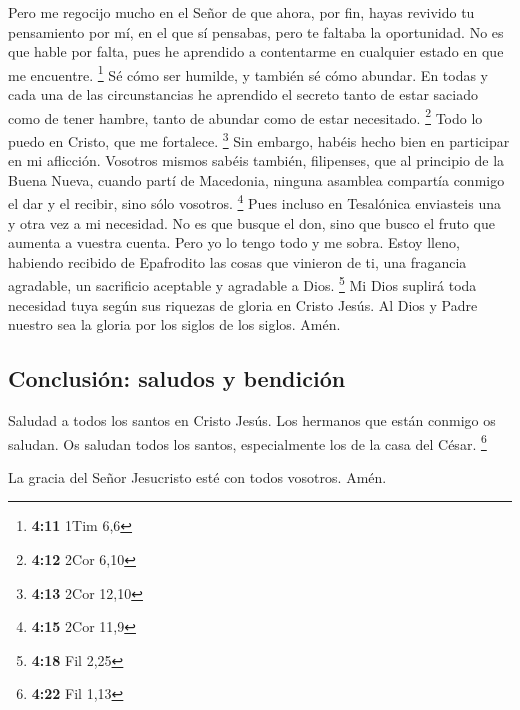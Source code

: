  Pero me regocijo mucho en el Señor de que ahora, por
fin, hayas revivido tu pensamiento por mí, en el que sí pensabas, pero
te faltaba la oportunidad.  No es que hable por falta,
pues he aprendido a contentarme en cualquier estado en que me encuentre.
\footnote{\textbf{4:11} 1Tim 6,6}  Sé cómo ser humilde, y
también sé cómo abundar. En todas y cada una de las circunstancias he
aprendido el secreto tanto de estar saciado como de tener hambre, tanto
de abundar como de estar necesitado. \footnote{\textbf{4:12} 2Cor 6,10}
 Todo lo puedo en Cristo, que me fortalece. \footnote{\textbf{4:13}
  2Cor 12,10}  Sin embargo, habéis hecho bien en
participar en mi aflicción.  Vosotros mismos sabéis
también, filipenses, que al principio de la Buena Nueva, cuando partí de
Macedonia, ninguna asamblea compartía conmigo el dar y el recibir, sino
sólo vosotros. \footnote{\textbf{4:15} 2Cor 11,9}  Pues
incluso en Tesalónica enviasteis una y otra vez a mi necesidad.
 No es que busque el don, sino que busco el fruto que
aumenta a vuestra cuenta.  Pero yo lo tengo todo y me
sobra. Estoy lleno, habiendo recibido de Epafrodito las cosas que
vinieron de ti, una fragancia agradable, un sacrificio aceptable y
agradable a Dios. \footnote{\textbf{4:18} Fil 2,25}  Mi
Dios suplirá toda necesidad tuya según sus riquezas de gloria en Cristo
Jesús.  Al Dios y Padre nuestro sea la gloria por los
siglos de los siglos. Amén.

\hypertarget{conclusiuxf3n-saludos-y-bendiciuxf3n}{%
\subsection{Conclusión: saludos y
bendición}\label{conclusiuxf3n-saludos-y-bendiciuxf3n}}

 Saludad a todos los santos en Cristo Jesús. Los hermanos
que están conmigo os saludan.  Os saludan todos los
santos, especialmente los de la casa del César. \footnote{\textbf{4:22}
  Fil 1,13}

 La gracia del Señor Jesucristo esté con todos vosotros.
Amén.
